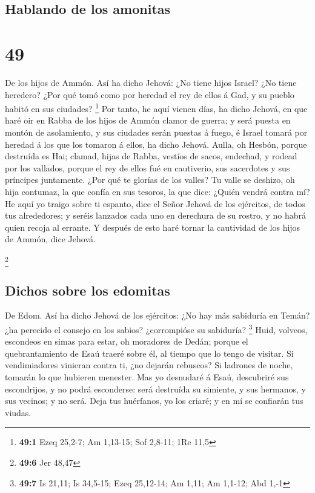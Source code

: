 \hypertarget{hablando-de-los-amonitas}{%
\subsection{Hablando de los amonitas}\label{hablando-de-los-amonitas}}

\hypertarget{section-48}{%
\section{49}\label{section-48}}

 De los hijos de Ammón. Así ha dicho Jehová: ¿No tiene hijos
Israel? ¿No tiene heredero? ¿Por qué tomó como por heredad el rey de
ellos á Gad, y su pueblo habitó en sus ciudades? \footnote{\textbf{49:1}
  Ezeq 25,2-7; Am 1,13-15; Sof 2,8-11; 1Re 11,5}  Por tanto,
he aquí vienen días, ha dicho Jehová, en que haré oir en Rabba de los
hijos de Ammón clamor de guerra; y será puesta en montón de asolamiento,
y sus ciudades serán puestas á fuego, é Israel tomará por heredad á los
que los tomaron á ellos, ha dicho Jehová.  Aulla, oh Hesbón,
porque destruída es Hai; clamad, hijas de Rabba, vestíos de sacos,
endechad, y rodead por los vallados, porque el rey de ellos fué en
cautiverio, sus sacerdotes y sus príncipes juntamente.  ¿Por
qué te glorías de los valles? Tu valle se deshizo, oh hija contumaz, la
que confía en sus tesoros, la que dice: ¿Quién vendrá contra mí?
 He aquí yo traigo sobre ti espanto, dice el Señor Jehová de
los ejércitos, de todos tus alrededores; y seréis lanzados cada uno en
derechura de su rostro, y no habrá quien recoja al errante. 
Y después de esto haré tornar la cautividad de los hijos de Ammón, dice
Jehová.

\footnote{\textbf{49:6} Jer 48,47}

\hypertarget{dichos-sobre-los-edomitas}{%
\subsection{Dichos sobre los edomitas}\label{dichos-sobre-los-edomitas}}

 De Edom. Así ha dicho Jehová de los ejércitos: ¿No hay más
sabiduría en Temán? ¿ha perecido el consejo en los sabios? ¿corrompióse
su sabiduría? \footnote{\textbf{49:7} Is 21,11; Is 34,5-15; Ezeq
  25,12-14; Am 1,11; Am 1,1-12; Abd 1,-1}  Huid, volveos,
escondeos en simas para estar, oh moradores de Dedán; porque el
quebrantamiento de Esaú traeré sobre él, al tiempo que lo tengo de
visitar.  Si vendimiadores vinieran contra ti, ¿no dejarán
rebuscos? Si ladrones de noche, tomarán lo que hubieren menester.
 Mas yo desnudaré á Esaú, descubriré sus escondrijos, y no
podrá esconderse: será destruída su simiente, y sus hermanos, y sus
vecinos; y no será.  Deja tus huérfanos, yo los criaré; y
en mí se confiarán tus viudas.

